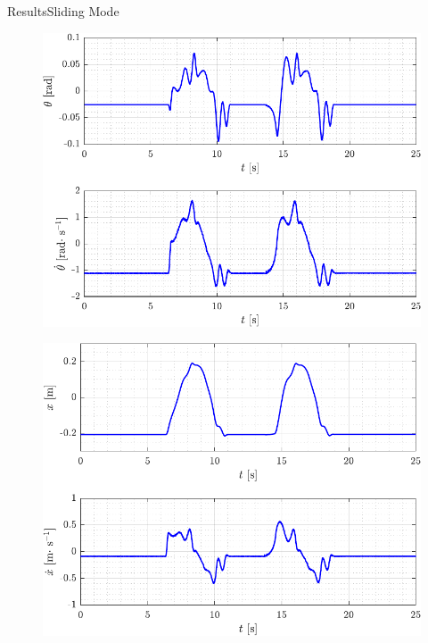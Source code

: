 \begin{frame}{Results}{Sliding Mode}
\hspace{-.9cm}
\begin{minipage}{\textwidth}
  \begin{minipage}{0.56\textwidth}
    \begin{figure}[H]
      \includegraphics[width=\textwidth]{figures/slidingModeTest2theta}
    \end{figure}
  \end{minipage}
  \begin{minipage}{0.56\textwidth}
    \begin{figure}[H]
      \includegraphics[width=\textwidth]{figures/slidingModeTest2x}
    \end{figure}
  \end{minipage}
\end{minipage}
\end{frame}

